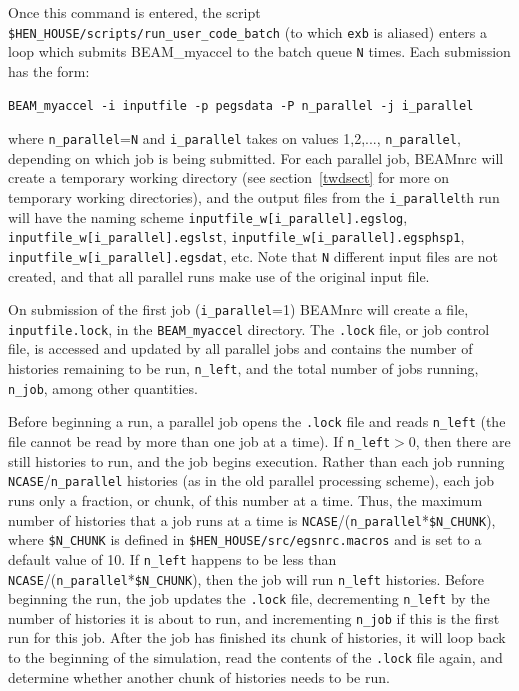 \documentclass[12pt,twoside]{article}
\begin{document}
Once this command is entered, the script
{\tt \$HEN\_HOUSE/scripts/run\_user\_code\_batch} (to which {\tt exb} is
aliased) enters a loop which submits BEAM\_myaccel to the batch queue
{\tt N} times.  Each submission has the form:
\begin{verbatim}
BEAM_myaccel -i inputfile -p pegsdata -P n_parallel -j i_parallel
\end{verbatim}
where {\tt n\_parallel}={\tt N} and {\tt i\_parallel} takes on values 1,2,...,
{\tt n\_parallel}, depending on which job is being submitted.
For each parallel job, BEAMnrc will create a temporary working directory
(see section~\ref{twdsect} for more on
temporary working directories), and the output files from the
{\tt i\_parallel}th run will have the naming scheme
{\tt inputfile\_w[i\_parallel].egslog}, {\tt inputfile\_w[i\_parallel].egslst},
{\tt inputfile\_w[i\_parallel].egsphsp1}, \\
{\tt inputfile\_w[i\_parallel].egsdat},
etc.  Note that {\tt N} different input files are not created, and that all
parallel runs make use of the original input file.

On submission of the first job ({\tt i\_parallel}=1) BEAMnrc will create
a file, {\tt inputfile.lock}, in the {\tt BEAM\_myaccel} directory.  The
{\tt .lock} file, or job control file, is accessed and updated by all parallel
jobs and contains
the number of histories remaining to be run, {\tt n\_left}, and the total
number of jobs running, {\tt n\_job}, among other quantities.

Before
beginning a run, a parallel job opens the {\tt .lock} file and
reads {\tt n\_left} (the file cannot be read by more than one job at
a time).  If {\tt n\_left}$>$0, then there are still histories
to run, and the job begins execution.
Rather than each job running {\tt NCASE}/{\tt n\_parallel}
histories (as in the old parallel processing scheme), each job runs only
a fraction, or chunk, of this number at a time.  Thus, the maximum number
of histories that a job runs at a time is
{\tt NCASE}/({\tt n\_parallel}*{\tt \$N\_CHUNK}), where {\tt \$N\_CHUNK}
is defined in {\tt \$HEN\_HOUSE/src/egsnrc.macros} and is set to a default
value of 10.  If {\tt n\_left} happens to be less than
{\tt NCASE}/({\tt n\_parallel}*{\tt \$N\_CHUNK}),
then the job will run {\tt n\_left} histories.  Before beginning the
run, the job updates the {\tt .lock} file, decrementing
{\tt n\_left} by the number of histories it is about to run, and
incrementing {\tt n\_job} if this is the first run for this job.
After the job has finished its chunk of histories, it will loop
back to the beginning of the simulation, read the contents of the
{\tt .lock} file again, and determine whether another
chunk of histories needs to be run.
\end{document}
